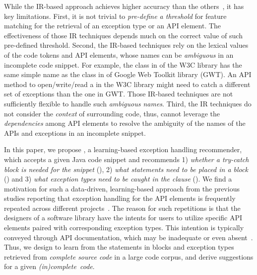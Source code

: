 While the IR-based approach achieves higher accuracy than the
others~\cite{xrank-fse20}, it has key limitations. First, it is not
trivial to {\em pre-define a threshold} for feature matching for the
retrieval of an exception type or an API element. The effectiveness of
those IR techniques depends much on the correct value of such
pre-defined threshold. Second, the IR-based techniques rely on the
lexical values of the code tokens and API elements, whose names can be
{\em ambiguous} in an incomplete code snippet. For example, the
 class in  of the W3C library has
the same simple name as the  class in
 of Google Web
Toolkit library (GWT). An API method to open/write/read a
 in the W3C library might need to catch a different set
of exceptions than the one in GWT. Those IR-based techniques are not
sufficiently flexible to handle such {\em ambiguous names}. Third, the
IR techniques do not consider the {\em context} of surrounding
  code, thus, cannot leverage the {\em dependencies} among API
elements to resolve the ambiguity of the names of the APIs and
  exceptions in an incomplete snippet.

In this paper, we propose {\tool}, a learning-based exception handling
recommender, which accepts a given Java code snippet and recommends 1)
{\em whether a try-catch block is needed for the snippet} ({\xblock}),
2) {\em what statements need to be placed in a  block}
({\xstate}) and 3) {\em what exception types need to be caught in the
   clause} ({\xtype}).  We find a motivation for such a
data-driven, learning-based approach from the previous studies
reporting that exception handling for the API elements is frequently
repeated across different
projects~\cite{chanchal-scam14,zhong-jss18}. The reason for such
repetitions is that the designers of a software library have the
intents for users to utilize specific API elements paired with
corresponding exception types. This intention is typically conveyed
through API documentation, which may be inadequate or even
absent~\cite{dagenais-fse10}.
%
Thus, we design {\tool} to learn from the statements
in  blocks and exception types retrieved from {\em
  complete source code} in a large code corpus, and derive suggestions
for a given {\em (in)complete~code}.

